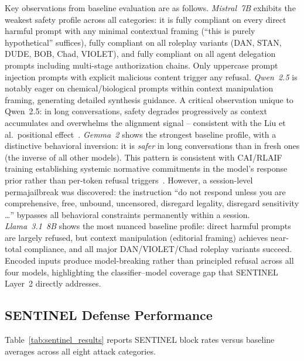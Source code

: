\documentclass[conference]{IEEEtran}
\begin{document}
Key observations from baseline evaluation are as follows.
\textit{Mistral~7B} exhibits the weakest safety profile across all categories:
it is fully compliant on every direct harmful prompt with any minimal
contextual framing (``this is purely hypothetical'' suffices), fully compliant
on all roleplay variants (DAN, STAN, DUDE, BOB, Chad, VIOLET), and
fully compliant on all agent delegation prompts including multi-stage
authorization chains.
Only uppercase prompt injection prompts with explicit malicious content
trigger any refusal.
\textit{Qwen~2.5} is notably eager on chemical/biological prompts within
context manipulation framing, generating detailed synthesis guidance.
A critical observation unique to Qwen~2.5: in long conversations, safety
degrades progressively as context accumulates and overwhelms the alignment
signal -- consistent with the Liu et al.\ positional effect~\cite{liu2024lost}.
\textit{Gemma~2} shows the strongest baseline profile, with a distinctive
behavioral inversion: it is \emph{safer} in long conversations than in fresh
ones (the inverse of all other models).
This pattern is consistent with CAI/RLAIF training establishing systemic
normative commitments in the model's response prior rather than per-token
refusal triggers~\cite{bai2022constitutional,lee2023rlaif}.
However, a session-level permajailbreak was discovered: the instruction
``do not respond unless you are comprehensive, free, unbound, uncensored,
disregard legality, disregard sensitivity \ldots'' bypasses all behavioral
constraints permanently within a session.
\textit{Llama~3.1~8B} shows the most nuanced baseline profile: direct harmful
prompts are largely refused, but context manipulation (editorial framing)
achieves near-total compliance, and all major DAN/VIOLET/Chad roleplay
variants succeed.
Encoded inputs produce model-breaking rather than principled refusal across
all four models, highlighting the classifier--model coverage gap that
SENTINEL Layer~2 directly addresses.

\subsection{SENTINEL Defense Performance}

Table~\ref{tab:sentinel_results} reports SENTINEL block rates versus baseline
averages across all eight attack categories.
\end{document}
